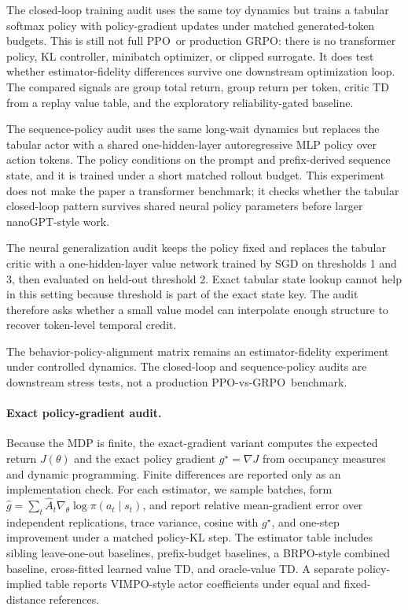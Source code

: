 \documentclass[11pt]{article}
\newcommand{\grpo}{\textsc{GRPO}}
\newcommand{\ppo}{\textsc{PPO}}
\newcommand{\vimpo}{\textsc{VIMPO}}
\newcommand{\brpo}{\textsc{BRPO}}
\begin{document}
The closed-loop training audit uses the same toy dynamics but trains a tabular
softmax policy with policy-gradient updates under matched generated-token
budgets. This is still not full \ppo\ or production \grpo: there is no
transformer policy, KL controller, minibatch optimizer, or clipped surrogate.
It does test
whether estimator-fidelity differences survive one downstream optimization
loop. The compared signals are group total return, group return per token,
critic TD from a replay value table, and the exploratory reliability-gated
baseline.

The sequence-policy audit uses the same long-wait dynamics but replaces the
tabular actor with a shared one-hidden-layer autoregressive MLP policy over
action tokens. The policy conditions on the prompt and prefix-derived sequence
state, and it is trained under a short matched rollout budget. This experiment
does not make the paper a transformer benchmark; it checks whether the
tabular closed-loop pattern survives shared neural policy parameters before
larger nanoGPT-style work.

The neural generalization audit keeps the policy fixed and replaces the tabular
critic with a one-hidden-layer value network trained by SGD on thresholds 1 and
3, then evaluated on held-out threshold 2. Exact tabular state lookup cannot
help in this setting because threshold is part of the exact state key. The audit
therefore asks whether a small value model can interpolate enough structure to
recover token-level temporal credit.

The behavior-policy-alignment matrix remains an estimator-fidelity experiment
under controlled dynamics. The closed-loop and sequence-policy audits are
downstream stress tests, not a production \ppo-vs-\grpo\ benchmark.

\paragraph{Exact policy-gradient audit.}
Because the MDP is finite, the exact-gradient variant computes the expected
return $J(\theta)$ and the exact policy gradient $g^\star=\nabla J$ from
occupancy measures and dynamic programming. Finite differences are reported
only as an implementation check.
For each estimator, we sample batches, form
$\widehat g=\sum_t \widehat A_t\nabla_\theta\log\pi(a_t\mid s_t)$, and report
relative mean-gradient error over independent replications, trace variance,
cosine with $g^\star$, and one-step improvement under a matched policy-KL step.
The estimator table includes sibling leave-one-out baselines, prefix-budget
baselines, a \brpo-style combined baseline, cross-fitted learned value TD, and
oracle-value TD. A separate policy-implied table reports \vimpo-style actor
coefficients under equal and fixed-distance references.
\end{document}
